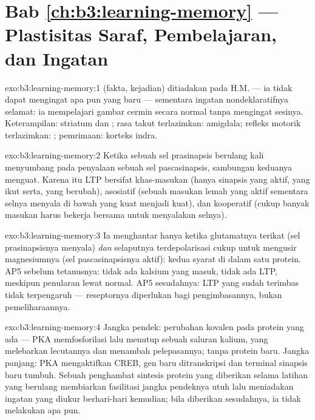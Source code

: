 \section*{Bab \ref{ch:b3:learning-memory} --- Plastisitas Saraf, Pembelajaran, dan Ingatan}

\begin{solution}{exo:b3:learning-memory:1}
 (fakta, kejadian) ditiadakan pada H.M. --- ia tidak dapat
mengingat apa pun yang baru --- sementara ingatan nondeklaratifnya selamat: ia mempelajari
gambar cermin secara normal tanpa mengingat sesinya. Keterampilan:
striatum dan ; rasa takut terlazimkan: amigdala; refleks motorik
terlazimkan: ; pemrimaan: korteks indra.
\end{solution}

\begin{solution}{exo:b3:learning-memory:2}
Ketika sebuah sel prasinapsis berulang kali menyumbang pada penyalaan sebuah sel
pascasinapsis, sambungan keduanya menguat. Karena itu LTP bersifat khas-masukan (hanya
sinapsis yang aktif, yang ikut serta, yang berubah), asosiatif (sebuah masukan
lemah yang aktif sementara selnya menyala di bawah yang kuat menjadi kuat),
dan kooperatif (cukup banyak masukan harus bekerja bersama untuk menyalakan selnya).
\end{solution}

\begin{solution}{exo:b3:learning-memory:3}
Ia menghantar hanya ketika glutamatnya terikat (sel prasinapsisnya menyala)
\emph{dan} selaputnya terdepolarisasi cukup untuk mengusir magnesiumnya
(sel pascasinapsisnya aktif): kedua syarat  di dalam
satu protein. AP5 sebelum tetanusnya: tidak ada kalsium yang masuk, tidak ada LTP, meskipun
penularan lewat  normal. AP5 sesudahnya: LTP yang sudah
terimbas tidak terpengaruh --- reseptornya diperlukan bagi pengimbasannya, bukan
pemeliharaannya.
\end{solution}

\begin{solution}{exo:b3:learning-memory:4}
Jangka pendek: perubahan kovalen pada protein yang ada --- PKA
memfosforilasi lalu menutup sebuah saluran kalium, yang melebarkan lecutannya
dan menambah pelepasannya; tanpa protein baru. Jangka panjang: PKA mengaktifkan CREB,
gen baru ditranskripsi dan terminal sinapsis baru tumbuh. Sebuah
penghambat sintesis protein yang diberikan selama latihan yang berulang membiarkan
fasilitasi jangka pendeknya utuh lalu meniadakan ingatan yang diukur berhari-hari
kemudian; bila diberikan sesudahnya, ia tidak melakukan apa pun.
\end{solution}

